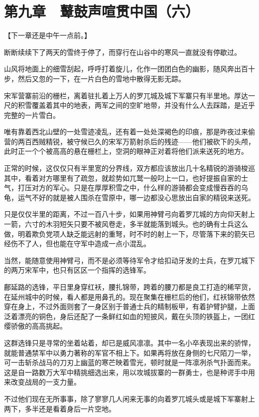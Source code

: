 \section{第九章　鼙鼓声喧贯中国（六）}

【下一章还是中午一点前。】

断断续续下了两天的雪终于停了，而穿行在山谷中的寒风一直就没有停歇过。

山风将地面上的细雪刮起，呼呼打着旋儿，化作一团团白色的幽影，随风奔出百十步，然后又忽的一下，在一片白色的雪地中散得无影无踪。

宋军营寨前沿的栅栏，离着驻扎着上万人的罗兀城及城下军寨只有半里地。厚达一尺的积雪覆盖着其中的地表，两军之间的空旷地带，并没有什么人去踩踏，是近乎完整的一片雪白。

唯有靠着西北山壁的一处雪迹凌乱，还有着一处处深褐色的印痕，那是昨夜过来偷营的两百西贼精锐，被守候已久的宋军万箭射杀后的残迹——他们被砍下的头颅，此时正一个个被高高的悬在栅栏上，空洞的眼神正对着将他们派来送死的地方。

正常的时候，这仅仅只有半里宽的分界线，双方都应该放出几十名精锐的游骑梭巡其中，看着对方哪里有了疏忽，就趁势如兀鹫一般叼上一口，也好提振自家的士气，打压对方的军心。只是在厚厚积雪之中，什么样的游骑都会变成慢吞吞的乌龟，运气不好的就是被人围杀在雪原中，哪一边都没心思放出自家的精锐来送死。

只是仅仅半里的距离，不过一百八十步，如果用神臂弓向着罗兀城的方向仰天射上一箭，六寸的木羽短矢只要不被风卷走，多半就能落到城头。也的确有士兵这么做，明着欺负党项人缺乏能远射的重弩，时不时的射上一下，尽管落下来的箭矢已经伤不了人，但也能在守军中造成一点小混乱。

当然，能随意使用神臂弓，而不是必须等待军令才给扣动牙发的士兵，在罗兀城下的两万宋军中，也只有区区一个指挥的选锋军。

鄜延路的选锋，平日里身穿红袄，腰扎锦带，跨着的腰刀都是良工打造的稀罕货，在延州城中的时候，看人都是用鼻孔的。现在聚集在栅栏后的他们，红袄锦带依然穿在身上，不过外面则套了一身区别于普通士兵的精制板甲，有着护臂护腿，上面泛着漂亮的铜色，身后还配了一条鲜红如血的短披风，戴在头顶的铁盔上，一团红缨骄傲的高高挑起。

这群选锋只是寻常的坐着站着，却已是威风凛凛。其中一名小卒表现出来的骄悍，就能普通禁军中以勇力著称的军官不相上下。如果再将放在身侧的七尺陌刀一举，可一击斩杀战马的刀刃上幽蓝的寒芒映着雪光，顿时就是一阵凛冽杀气扑面而来。这是自一路数万大军中精挑细选出来，用以攻城拔寨的一群勇士，也是种谔手中用来改变战局的一支力量。

不过他们现在无所事事，除了寥寥几人闲来无事的向着罗兀城头或是城下军寨射上两下，多半还是看着身后一片空地。

